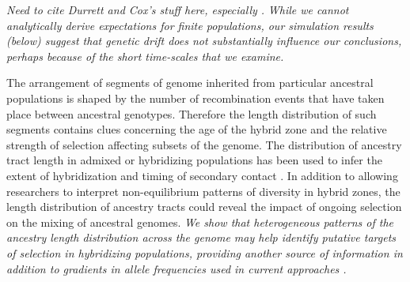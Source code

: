 \documentclass[11pt,letterpaper]{article}
\newcommand{\alisa}[1]{{\em \color{red} #1}}
\newcommand{\plr}[1]{{\em \color{blue} #1}}
\newcommand{\yb}[1]{{\em \color{magenta} #1}}
\begin{document}
\plr{Need to cite Durrett and Cox's stuff here, especially \citet{durrett2007width}.}
\yb{While we cannot analytically derive expectations for finite populations, our simulation results (below) suggest that genetic drift does not substantially influence our conclusions, perhaps because of the short time-scales that we examine.}   


The arrangement of segments of genome inherited from particular ancestral populations
is shaped by the number of recombination events that have taken place between ancestral genotypes. 
Therefore the length distribution of such segments contains clues concerning the age of the hybrid zone and the relative strength of selection affecting subsets of the genome. %
The distribution of ancestry tract length in admixed or hybridizing populations has been used to infer the extent of hybridization and timing of secondary contact \citep{Price2009, Gravel2012,sedghifar2015spatial}. 
In addition to allowing researchers to interpret non-equilibrium patterns of diversity in hybrid zones, 
the length distribution of ancestry tracts could reveal the impact of ongoing selection on the mixing of ancestral genomes. %
\yb{We show that heterogeneous patterns of the ancestry length distribution across the genome may help identify putative targets of selection in hybridizing populations, providing another source of information in addition to gradients in allele frequencies  used in current approaches \citep[e.g. ][]{Porter1997, Gompert2012}. }
\end{document}
